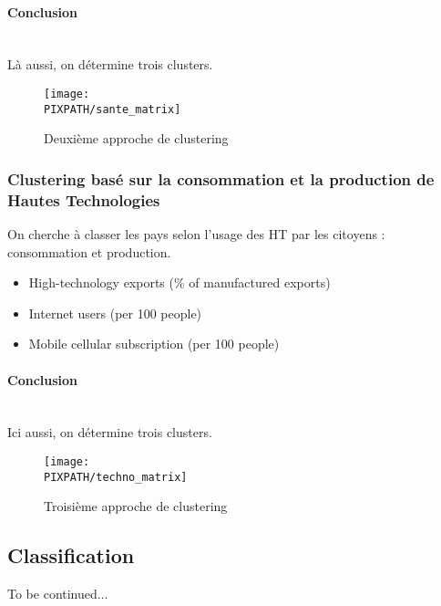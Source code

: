 \paragraph{Conclusion}\hfill\\

Là aussi, on détermine trois clusters.

\begin{sidewaysfigure}[h]
\centering
\caption{Deuxième approche de clustering}
\texttt{[image: \\PIXPATH/sante\_matrix]}
\end{sidewaysfigure}


\subsubsection{Clustering basé sur la consommation et la production de
Hautes Technologies}

On cherche à classer les pays selon l'usage des HT par les citoyens :
consommation et production.

\begin{itemize}
\item High-technology exports (\% of manufactured exports)
\item Internet users (per 100 people)
\item Mobile cellular subscription (per 100 people)
\end{itemize}

\paragraph{Conclusion}\hfill\\

Ici aussi, on détermine trois clusters.

\begin{sidewaysfigure}[h]
\centering
\caption{Troisième approche de clustering}
\texttt{[image: \\PIXPATH/techno\_matrix]}
\end{sidewaysfigure}


\subsection{Classification}

To be continued...
